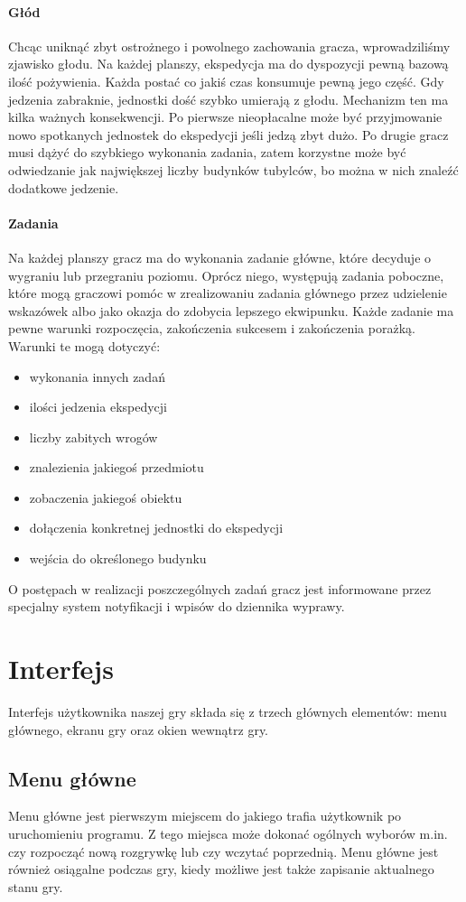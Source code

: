 \documentclass[licencjacka]{pracamgr}
\begin{document}
      \paragraph{Głód}
	Chcąc uniknąć zbyt ostrożnego i powolnego zachowania gracza, wprowadziliśmy zjawisko głodu. Na każdej planszy, ekspedycja ma do dyspozycji pewną
	bazową ilość pożywienia. Każda postać co jakiś czas konsumuje pewną jego część. Gdy jedzenia zabraknie, jednostki dość szybko
	umierają z głodu. Mechanizm ten ma kilka ważnych konsekwencji. Po pierwsze nieopłacalne może być przyjmowanie nowo spotkanych jednostek do ekspedycji
	jeśli jedzą zbyt dużo. Po drugie gracz musi dążyć do szybkiego wykonania zadania, zatem korzystne może być odwiedzanie jak największej liczby budynków
	tubylców, bo można w nich znaleźć dodatkowe jedzenie.
      \paragraph{Zadania}
	Na każdej planszy gracz ma do wykonania zadanie główne, które decyduje o wygraniu lub przegraniu poziomu. Oprócz niego,
	występują zadania poboczne, które mogą graczowi pomóc w zrealizowaniu zadania głównego przez udzielenie wskazówek albo jako okazja do zdobycia lepszego
	ekwipunku. Każde zadanie ma pewne warunki rozpoczęcia, zakończenia sukcesem i zakończenia porażką. Warunki te mogą dotyczyć:
	\begin{itemize}
	 \item wykonania innych zadań
	 \item ilości jedzenia ekspedycji
	 \item liczby zabitych wrogów
	 \item znalezienia jakiegoś przedmiotu
	 \item zobaczenia jakiegoś obiektu
	 \item dołączenia konkretnej jednostki do ekspedycji
	 \item wejścia do określonego budynku
	\end{itemize}
	O postępach w realizacji poszczególnych zadań gracz jest informowane przez specjalny system notyfikacji i wpisów do dziennika wyprawy.


  \section{Interfejs}
    Interfejs użytkownika naszej gry składa się z trzech głównych elementów: menu głównego, ekranu gry oraz okien wewnątrz gry.

    \subsection{Menu główne}
      Menu główne jest pierwszym miejscem do jakiego trafia użytkownik po uruchomieniu programu. Z tego miejsca może dokonać ogólnych wyborów m.in. czy
      rozpocząć nową rozgrywkę lub czy wczytać poprzednią. Menu główne jest również osiągalne podczas gry, kiedy możliwe jest także zapisanie aktualnego stanu gry.
\end{document}
